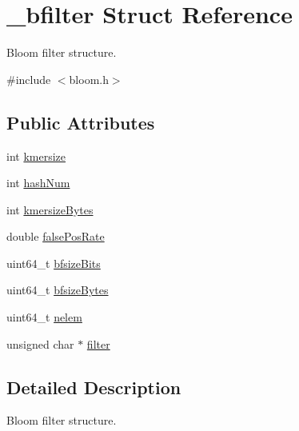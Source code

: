 \hypertarget{struct__bfilter}{\section{\+\_\+bfilter Struct Reference}
\label{struct__bfilter}
}


Bloom filter structure.  




{\ttfamily \#include $<$bloom.\+h$>$}

\subsection*{Public Attributes}
\begin{DoxyCompactItemize}
\item 
int \hyperlink{struct__bfilter_aaccbef9fad8a88369249ff0638b2a032}{kmersize}
\item 
int \hyperlink{struct__bfilter_ab1c41e821137ae9d35a240c67819d51f}{hash\+Num}
\item 
int \hyperlink{struct__bfilter_aa7612223f56f3bb6cb40d96645bc982e}{kmersize\+Bytes}
\item 
double \hyperlink{struct__bfilter_a7a87113cbc7834ff20dd1f40cd06973c}{false\+Pos\+Rate}
\item 
uint64\+\_\+t \hyperlink{struct__bfilter_adb5c576f93d920a3ad5250781698d6ff}{bfsize\+Bits}
\item 
uint64\+\_\+t \hyperlink{struct__bfilter_a61487a85ddb47e6642f8c805f4d2f041}{bfsize\+Bytes}
\item 
uint64\+\_\+t \hyperlink{struct__bfilter_afdabad504407bfdee536cf67c66303c4}{nelem}
\item 
unsigned char $\ast$ \hyperlink{struct__bfilter_a259a669cdf8b5a8da27e8346c1edea32}{filter}
\end{DoxyCompactItemize}


\subsection{Detailed Description}
Bloom filter structure. 

